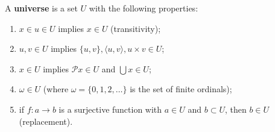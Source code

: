 A \textbf{universe} is a set $U$ with the following properties:
\begin{enumerate}
\item[(i)] $x \in u \in U$ implies $x \in U$ (transitivity);
\item[(ii)] $u, v \in U$ implies $\{u,v\}, \langle u,v\rangle, u \times v \in U$;
\item[(iii)] $x \in U$ implies $\mathcal{P}x \in U$ and $\bigcup x \in U$;
\item[(iv)] $\omega \in U$ (where $\omega = \{0,1,2,\ldots\}$ is the set of finite ordinals);
\item[(v)] if $f: a \rightarrow b$ is a surjective function with $a \in U$ and $b \subset U$, then $b \in U$ (replacement).
\end{enumerate}